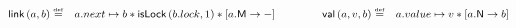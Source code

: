 \begin{figure}
\[\begin{array}{@{} l @{}}
\begin{array}{@{} r l @{\hspace{1.5cm}} r l @{}}
		\link{a}{b} \eqdef & \cell{a.next}{b} * \isLock{b.lock}{1} * \modC{a}
		& \val{a}{v}{b} \eqdef & \cell{a.value}{v} * \nextC{a}{b}
	\end{array}\\
		
%
	

		


\end{array}\]
\end{figure}
